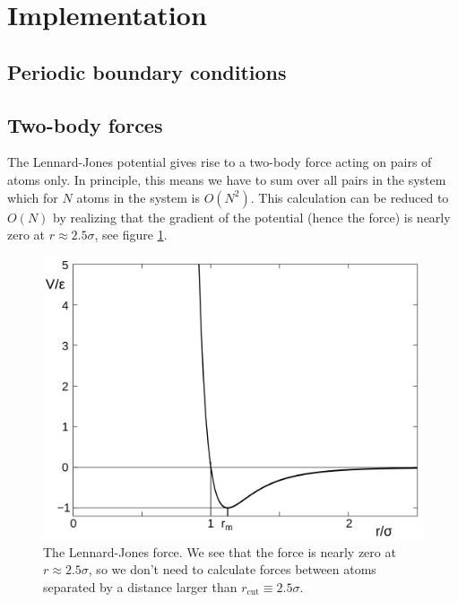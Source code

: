 \section{Implementation}
\label{sec:md_implementation}
\subsection{Periodic boundary conditions}

\subsection{Two-body forces}
\label{sec:md_implementation_two_body_forces}
The Lennard-Jones potential gives rise to a two-body force acting on pairs of atoms only. In principle, this means we have to sum over all pairs in the system which for $N$ atoms in the system is $O(N^2)$. This calculation can be reduced to $O(N)$ by realizing that the gradient of the potential (hence the force) is nearly zero at $r \approx 2.5\sigma$, see figure \ref{fig:md_lennard_jones_2}. 
\begin{figure}[h]
\begin{center}
\includegraphics[width=1.0\textwidth, trim=0cm 0cm 0cm 0cm, clip]{MD/figures/lennard_jones.png}
\end{center}
\caption{The Lennard-Jones force. We see that the force is nearly zero at $r\approx 2.5\sigma$, so we don't need to calculate forces between atoms separated by a distance larger than $r_\text{cut} \equiv 2.5\sigma$.}
\label{fig:md_lennard_jones_2}
\end{figure}
